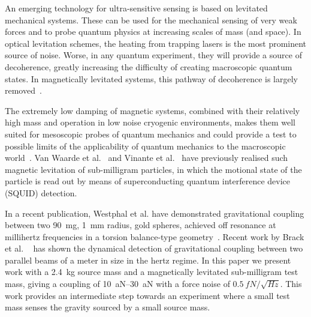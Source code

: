 \documentclass[pdflatex,sn-mathphys,12pt]{sn-jnl}
\begin{document}
    
    An emerging technology for ultra-sensitive sensing is based on levitated mechanical systems. These can be used for the mechanical sensing of very weak forces and to probe quantum physics at increasing scales of mass (and space). In optical levitation schemes, the heating from trapping lasers is the most prominent source of noise. Worse, in any quantum experiment, they will provide a source of decoherence, greatly increasing the difficulty of creating macroscopic quantum states. In magnetically levitated systems, this pathway of decoherence is largely removed~\cite{Romero2021}.
    
    
    The extremely low damping of magnetic systems, combined with their relatively high mass and operation in low noise cryogenic environments, makes them well suited for mesoscopic probes of quantum mechanics and could provide a test to possible limits of the applicability of quantum mechanics to the macroscopic world~\cite{leggett2002,arndt2014}.
    Van Waarde et al.~\cite{Waarde2016} and Vinante et al.~\cite{vinante2020} have previously realised such magnetic levitation of sub-milligram particles, in which the motional state of the particle is read out by means of superconducting quantum interference device (SQUID) detection.
    
    
    In a recent publication, Westphal et al. have demonstrated gravitational coupling between two \SI{90}{mg}, \SI{1}{mm} radius, gold spheres, achieved off resonance at millihertz frequencies in a torsion balance-type geometry~\cite{aspelmeyer2021}. Recent work by Brack et al. ~\cite{brack2022} has shown the dynamical detection of gravitational coupling between two parallel beams of a  meter in size in the hertz regime. In this paper we present work with a \SI{2.4}{kg} source mass and a magnetically levitated sub-milligram test mass, giving a coupling of \SIrange{10}{30}{aN} with a force noise of $\SI{0.5}{fN/\sqrt{Hz}}$. This work provides an intermediate step towards an experiment where a small test mass senses the gravity sourced by a small source mass.
%

%
\end{document}
